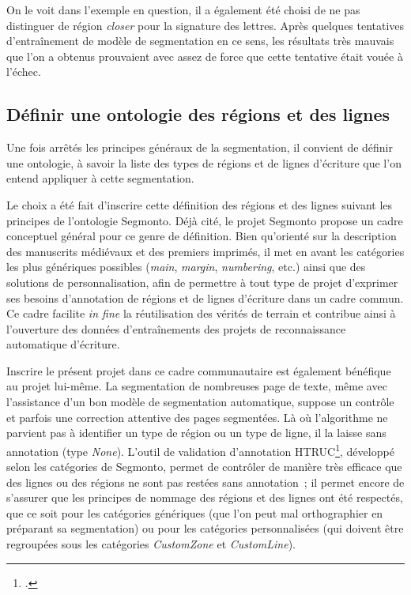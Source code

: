 \documentclass[a4paper,12pt,twoside]{book}
\begin{document}
				On le voit dans l'exemple en question, il a également été choisi de ne pas distinguer de région \textit{closer} pour la signature des lettres. Après quelques tentatives d'entraînement de modèle de segmentation en ce sens, les résultats très mauvais que l'on a obtenus prouvaient avec assez de force que cette tentative était vouée à l'échec.
				
			\subsection{Définir une ontologie des régions et des lignes}
				Une fois arrêtés les principes généraux de la segmentation, il convient de définir une ontologie, à savoir la liste des types de régions et de lignes d'écriture que l'on entend appliquer à cette segmentation.
				
				Le choix a été fait d'inscrire cette définition des régions et des lignes suivant les principes de l'ontologie \gls{Segmonto}. Déjà cité, le projet \gls{Segmonto} propose un cadre conceptuel général pour ce genre de définition. Bien qu'orienté sur la description des manuscrits médiévaux et des premiers imprimés, il met en avant les catégories les plus génériques possibles (\textit{main}, \textit{margin}, \textit{numbering}, etc.) ainsi que des solutions de personnalisation, afin de permettre à tout type de projet d'exprimer ses besoins d'annotation de régions et de lignes d'écriture dans un cadre commun. Ce cadre facilite \textit{in fine} la réutilisation des vérités de terrain et contribue ainsi à l'ouverture des données d'entraînements des projets de reconnaissance automatique d'écriture.
				
				Inscrire le présent projet dans ce cadre communautaire est également bénéfique au projet lui-même. La segmentation de nombreuses page de texte, même avec l'assistance d'un bon modèle de segmentation automatique, suppose un contrôle et parfois une correction attentive des pages segmentées. Là où l'algorithme ne parvient pas à identifier un type de région ou un type de ligne, il la laisse sans annotation (type \textit{None}). L'outil de validation d'annotation HTRUC\footcite{clericeHTRUCHTRUnitedCatalog2021}, développé selon les catégories de \gls{Segmonto}, permet de contrôler de manière très efficace que des lignes ou des régions ne sont pas restées sans annotation~; il permet encore de s'assurer que les principes de nommage des régions et des lignes ont été respectés, que ce soit pour les catégories génériques (que l'on peut mal orthographier en préparant sa segmentation) ou pour les catégories personnalisées (qui doivent être regroupées sous les catégories \textit{CustomZone} et \textit{CustomLine}).
				
\end{document}

